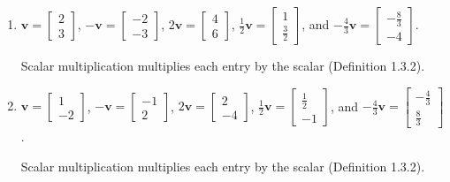 \begin{solution}
\begin{enumerate}
  \item \begin{answer}
         $\mathbf{v} = \begin{bmatrix} 2 \\ 3 \end{bmatrix}$,
         $-\mathbf{v} = \begin{bmatrix} -2 \\ -3 \end{bmatrix}$,
         $2\mathbf{v} = \begin{bmatrix} 4 \\ 6 \end{bmatrix}$,
         $\frac{1}{2}\mathbf{v} = \begin{bmatrix} 1 \\ \frac{3}{2} \end{bmatrix}$, and
         $-\frac{4}{3}\mathbf{v} = \begin{bmatrix} -\frac{8}{3} \\ -4 \end{bmatrix}$.
       \end{answer}
       Scalar multiplication multiplies each entry by the scalar (Definition 1.3.2).
  \item \begin{answer}
         $\mathbf{v} = \begin{bmatrix} 1 \\ -2 \end{bmatrix}$,
         $-\mathbf{v} = \begin{bmatrix} -1 \\ 2 \end{bmatrix}$,
         $2\mathbf{v} = \begin{bmatrix} 2 \\ -4 \end{bmatrix}$,
         $\frac{1}{2}\mathbf{v} = \begin{bmatrix} \frac{1}{2} \\ -1 \end{bmatrix}$, and
         $-\frac{4}{3}\mathbf{v} = \begin{bmatrix} -\frac{4}{3} \\ \frac{8}{3} \end{bmatrix}$.
       \end{answer}
       Scalar multiplication multiplies each entry by the scalar (Definition 1.3.2).

\end{enumerate}
\end{solution}

